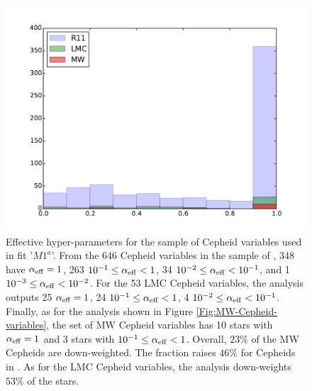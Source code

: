 \begin{figure}[hbtp]
\centering
\includegraphics[scale=.75]{figures/chapter-h0/effective_HP_histogram.pdf}
\caption{Effective hyper-parameters for the sample of Cepheid variables used in fit '$M1^a$'. From the 646 Cepheid variables in the sample of \cite{Riess:2011yx}, 348 have $\alpha_{\mathrm{eff}}=1$, 263 $10^{-1}\leq \alpha_{\mathrm{eff}} < 1$, 34  $10^{-2}\leq \alpha_{\mathrm{eff}} < 10^{-1}$, and 1 $10^{-3} \leq \alpha_{\mathrm{eff}} < 10^{-2}$. For the 53 LMC Cepheid variables, the analysis outputs 25 $\alpha_{\mathrm{eff}}=1$, 24 $10^{-1}\leq \alpha_{\mathrm{eff}} < 1$, 4  $10^{-2}\leq \alpha_{\mathrm{eff}} < 10^{-1}$. Finally, as for the analysis shown in Figure \ref{Fig:MW-Cepheid-variables}, the set of MW Cepheid variables has 10 stars with $\alpha_{\mathrm{eff}}=1$ and 3 stars with $10^{-1}\leq \alpha_{\mathrm{eff}} < 1$. Overall, $23\%$ of the MW Cepheids are down-weighted. The fraction raises $46\%$ for Cepheids in \cite{Riess:2011yx}. As for the LMC Cepheid variables, the analysis down-weights $53\%$ of the stars.}
\label{Fig:effective-HP-fitM1a}
\end{figure}

